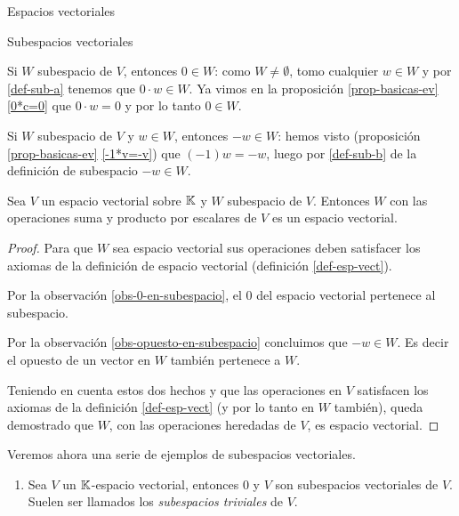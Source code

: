 \begin{chapter}{Espacios vectoriales}
\begin{section}{Subespacios vectoriales}
    \begin{observacion} \label{obs-0-en-subespacio} Si $W$ subespacio de $V$,  entonces $0 \in W$: como  $W \ne \emptyset$, tomo  cualquier $w \in W$ y  por \ref{def-sub-a} tenemos que $0\cdot w \in W$. Ya vimos en la proposición \ref{prop-basicas-ev} \ref{0*c=0}  que $0 \cdot w =0$ y por lo tanto $0 \in W$. 
    \end{observacion}

    \begin{observacion}\label{obs-opuesto-en-subespacio} Si $W$ subespacio de $V$ y $w \in W$,  entonces $-w \in W$: hemos visto (proposición \ref{prop-basicas-ev} \ref{-1*v=-v}) que  $(-1)w=-w $, luego por \ref{def-sub-b} de la definición de subespacio $-w \in W$.
    \end{observacion}

    \begin{teorema}
        Sea $V$ un espacio vectorial sobre $\mathbb K$ y $W$ subespacio de $V$. Entonces $W$ con las operaciones suma y producto por escalares de $V$ es un espacio vectorial.
    \end{teorema}
    \begin{proof} 
        Para que $W$ sea espacio vectorial sus operaciones deben satisfacer los axiomas de la definición de espacio vectorial (definición \ref{def-esp-vect}). 
        
        Por la observación \ref{obs-0-en-subespacio}, el $0$ del espacio vectorial pertenece al subespacio. 
        
       Por la observación  \ref{obs-opuesto-en-subespacio} concluimos que $-w\in W$. Es decir el opuesto de un vector en $W$ también pertenece a $W$. 
        
        Teniendo en cuenta estos dos hechos y que las operaciones en $V$ satisfacen los axiomas de la definición \ref{def-esp-vect} (y por lo tanto en $W$ también),  queda demostrado que $W$, con las operaciones heredadas de $V$, es espacio vectorial.  
    \end{proof}



\begin{ejemplo*} Veremos ahora una serie de ejemplos de subespacios vectoriales.
    \begin{enumerate}
        \item Sea $V$ un $\mathbb K$-espacio vectorial, entonces $0$ y $V$ son subespacios vectoriales de $V$. Suelen ser llamados los \textit{subespacios triviales} de $V$.
        

\end{enumerate}
\end{ejemplo*}
\end{section}
\end{chapter}
